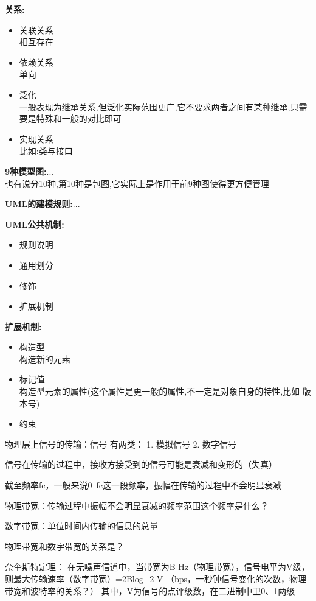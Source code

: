 \documentclass[UTF8,a4paper]{ctexart}
\begin{document}
\textbf{关系:}
\begin{itemize}
  \item 关联关系\\
  相互存在
  \item 依赖关系\\
  单向
  \item 泛化\\
  一般表现为继承关系,但泛化实际范围更广,它不要求两者之间有某种继承,只需要是特殊和一般的对比即可
  \item 实现关系\\
  比如:类与接口
\end{itemize}

\textbf{9种模型图:}...\\
也有说分10种,第10种是包图,它实际上是作用于前9种图使得更方便管理

\textbf{UML的建模规则:}...

\textbf{UML公共机制:}
\begin{itemize}
  \item 规则说明
  \item 通用划分
  \item 修饰
  \item 扩展机制
\end{itemize}

\textbf{扩展机制:}
\begin{itemize}
  \item 构造型\\
  构造新的元素
  \item 标记值\\
  构造型元素的属性(这个属性是更一般的属性,不一定是对象自身的特性,比如 版本号)
  \item 约束
\end{itemize}

物理层上信号的传输：信号
有两类：
1. 模拟信号
2. 数字信号

信号在传输的过程中，接收方接受到的信号可能是衰减和变形的（失真）

截至频率fc，一般来说0~fc这一段频率，振幅在传输的过程中不会明显衰减

物理带宽：传输过程中振幅不会明显衰减的频率范围{这个频率是什么？}

数字带宽：单位时间内传输的信息的总量

物理带宽和数字带宽的关系是？

奈奎斯特定理：
在无噪声信道中，当带宽为B Hz（物理带宽），信号电平为V级，则最大传输速率（数字带宽）=2Blog_2 V （bps，一秒钟信号变化的次数，物理带宽和波特率的关系？）
其中，V为信号的点评级数，在二进制中卫0、1两级
\end{document}
